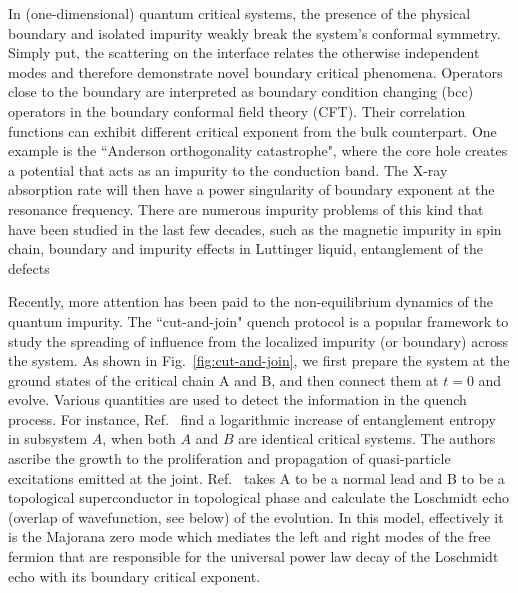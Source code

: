 

In (one-dimensional) quantum critical systems, the presence of the physical boundary and isolated impurity weakly break the system's conformal symmetry. Simply put, the scattering on the interface relates the otherwise independent modes and therefore demonstrate novel boundary critical phenomena\cite{cardy_boundary_2004}. Operators close to the boundary are interpreted as boundary condition changing (bcc) operators\cite{oshikawa_boundary_1997,affleck_boundary_1997} in the boundary conformal field theory (CFT). Their correlation functions can exhibit different critical exponent from the bulk counterpart\cite{cardy_conformal_1984}. One example is the ``Anderson orthogonality catastrophe", where the core hole creates a potential that acts as an impurity to the conduction band. The X-ray absorption rate will then have a power singularity of boundary exponent\cite{affleck_boundary_1997} at the resonance frequency. There are numerous impurity problems of this kind that have been studied in the last few decades, such as the magnetic impurity in spin chain\cite{eggert_magnetic_1992}, boundary and impurity effects in Luttinger liquid\cite{fabrizio_interacting_1995}, entanglement of the defects\cite{peschel_entanglement_2005, igloi_entanglement_2009,calabrese_entanglement_2012} \etc

Recently, more attention has been paid to the non-equilibrium dynamics of the quantum impurity. The ``cut-and-join" quench protocol is a popular framework to study the spreading of influence from the localized impurity (or boundary) across the system. As shown in Fig.~\ref{fig:cut-and-join}, we first prepare the system at the ground states of the critical chain A and B, and then connect them at $t = 0$ and evolve. Various quantities are used to detect the information in the quench process. For instance, Ref.~ find a logarithmic increase of entanglement entropy in subsystem $A$, when both $A$ and $B$ are identical critical systems. The authors ascribe the growth to the proliferation and propagation of quasi-particle excitations emitted at the joint. Ref.~ takes A to be a normal lead and B to be a topological superconductor in topological phase and calculate the Loschmidt echo (overlap of wavefunction, see below) of the evolution. In this model, effectively it is the Majorana zero mode which mediates the left and right modes of the free fermion that are responsible for the universal power law decay of the Loschmidt echo with its boundary critical exponent. 

